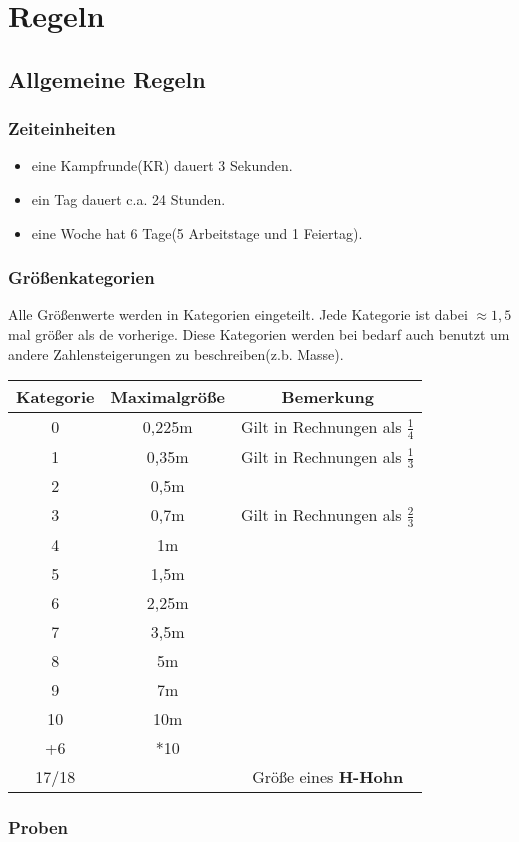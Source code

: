 \raggedright
\part{Regeln}
\chapter{Allgemeine Regeln}
\section{Zeiteinheiten}
\begin{itemize}
\item eine Kampfrunde(KR) dauert 3 Sekunden.
\item ein Tag dauert c.a. 24 Stunden.
\item eine Woche hat 6 Tage(5 Arbeitstage und 1 Feiertag).
\end{itemize}

\section{Größenkategorien}
Alle Größenwerte werden in Kategorien eingeteilt. Jede Kategorie ist dabei $\approx1,5$ mal größer als de vorherige. Diese Kategorien werden bei bedarf auch benutzt um andere Zahlensteigerungen zu beschreiben(z.b. Masse).
\begin{tabular}{|c|c|c|}
\hline 
Kategorie & Maximalgröße & Bemerkung \\ 
\hline 
0 & 0,225m & Gilt in Rechnungen als $\frac{1}{4}$ \\ 
\hline 
1 & 0,35m & Gilt in Rechnungen als $\frac{1}{3}$\\ 
\hline 
2 & 0,5m &\\ 
\hline 
3 & 0,7m & Gilt in Rechnungen als $\frac{2}{3}$\\ 
\hline 
4 & 1m &\\ 
\hline 
5 & 1,5m& \\ 
\hline 
6 & 2,25m& \\ 
\hline 
7 & 3,5m& \\ 
\hline 
8 & 5m &\\ 
\hline 
9 & 7m& \\ 
\hline 
10 & 10m &\\ 
\hline 
+6 & *10& \\ 
\hline 
17/18 &  & Größe eines \textbf{H-Hohn}\\ 
\hline 
\end{tabular} 
\section{Proben}
\label{AllgProben}
